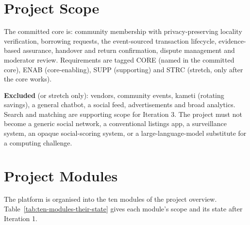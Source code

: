 \section{Project Scope}\label{sec:project-scope}
The committed core is: community membership with privacy-preserving locality verification, borrowing requests, the event-sourced transaction lifecycle, evidence-based assurance, handover and return confirmation, dispute management and moderator review. Requirements are tagged CORE (named in the committed core), ENAB (core-enabling), SUPP (supporting) and STRC (stretch, only after the core works).

\textbf{Excluded} (or stretch only): vendors, community events, kameti (rotating savings), a general chatbot, a social feed, advertisements and broad analytics. Search and matching are supporting scope for Iteration 3. The project must not become a generic social network, a conventional listings app, a surveillance system, an opaque social-scoring system, or a large-language-model substitute for a computing challenge.

\section{Project Modules}\label{sec:project-modules}
The platform is organised into the ten modules of the project overview. Table~\ref{tab:ten-modules-their-state} gives each module's scope and its state after Iteration 1.

